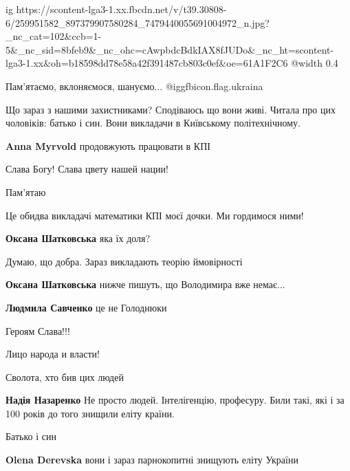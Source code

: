  
 
 
 
 

\ifcmt
  ig https://scontent-lga3-1.xx.fbcdn.net/v/t39.30808-6/259951582_897379907580284_7479440055691004972_n.jpg?_nc_cat=102&ccb=1-5&_nc_sid=8bfeb9&_nc_ohc=cAwpbdcBdkIAX8fJUDo&_nc_ht=scontent-lga3-1.xx&oh=b18598dd78e58a42f391487cb803c0ef&oe=61A1F2C6
  @width 0.4
\fi

Пам'ятаємо, вклоняємося, шануємо... @igg{fbicon.flag.ukraina}


Що зараз з нашими захистниками? Сподіваюсь що вони живі. Читала про цих
чоловіків: батько і син. Вони викладачи в Київському політехнічному.

\textbf{Anna Myrvold} продовжують працювати в КПІ

Слава Богу! Слава цвету нашей нации!

Пам'ятаю

Це обидва викладачі математики КПІ моєї дочки. Ми гордимося ними!

\textbf{Оксана Шатковська} яка їх доля?

Думаю, що добра. Зараз викладають теорію ймовірності

\textbf{Оксана Шатковська} нижче пишуть, що Володимира вже немає...

\textbf{Людмила Савченко} це не Голоднюки

Героям Слава!!!

Лицо народа и власти!

Сволота, хто бив цих людей

\textbf{Надія Назаренко} Не просто людей. Інтелігенцію, професуру. Били такі, які і за 100 років до того знищили еліту країни.

Батько і син

\textbf{Olena Derevska} вони і зараз парнокопитні знищують еліту України

